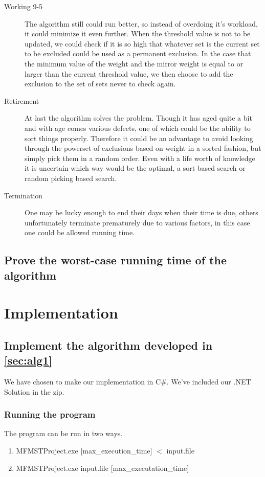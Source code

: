 \documentclass[12pt]{report}
\begin{document}
\begin{description}
	\item[Working 9-5] The algorithm still could run better, so instead of overdoing it's workload, it could minimize it even further. When the threshold value is not to be updated, we could check if it is so high that whatever set is the current set to be excluded could be used as a permanent exclusion. In the case that the minimum value of the weight and the mirror weight is equal to or larger than the current threshold value, we then choose to add the exclusion to the set of sets never to check again.
	
	\item[Retirement] At last the algorithm solves the problem. Though it has aged quite a bit and with age comes various defects, one of which could be the ability to sort things properly. Therefore it could be an advantage to avoid looking through the powerset of exclusions based on weight in a sorted fashion, but simply pick them in a random order. Even with a life worth of knowledge it is uncertain which way would be the optimal, a sort based search or random picking based search.
	
	\item[Termination] One may be lucky enough to end their days when their time is due, others unfortunately terminate prematurely due to various factors, in this case one could be allowed running time. 
\end{description}


\section{Prove the worst-case running time of the algorithm}

\chapter{Implementation}
\section{Implement the algorithm developed in \ref{sec:alg1}}
We have chosen to make our implementation in C\#. We've included our .NET Solution in the zip.
\subsection{Running the program}
The program can be run in two ways.
\begin{enumerate}
	\item MFMSTProject.exe [max\_execution\_time] $<$ input.file
	\item MFMSTProject.exe input.file [max\_executation\_time]
\end{enumerate}
\end{document}

